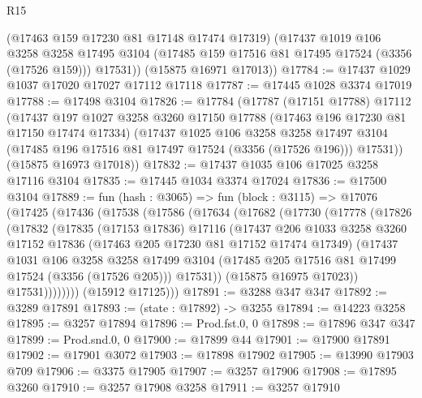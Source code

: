 \begin{lexlean}{R15}
\begin{coremodule}
        (@17463 @159 @17230 @81 @17148 @17474 @17319)
        (@17437
          @1019
          @106
          @3258
          @3258
          @17495
          @3104
          (@17485 @159 @17516 @81 @17495 @17524 (@3356 (@17526 @159)))
          @17531))
      (@15875 @16971 @17013))
@17784 := @17437 @1029 @1037 @17020 @17027 @17112 @17118
@17787 := @17445 @1028 @3374 @17019
@17788 := @17498 @3104
@17826 := @17784
    (@17787
      (@17151 @17788)
      @17112
      (@17437
        @197
        @1027
        @3258
        @3260
        @17150
        @17788
        (@17463 @196 @17230 @81 @17150 @17474 @17334)
        (@17437
          @1025
          @106
          @3258
          @3258
          @17497
          @3104
          (@17485 @196 @17516 @81 @17497 @17524 (@3356 (@17526 @196)))
          @17531))
      (@15875 @16973 @17018))
@17832 := @17437 @1035 @106 @17025 @3258 @17116 @3104
@17835 := @17445 @1034 @3374 @17024
@17836 := @17500 @3104
@17889 := fun (hash : @3065) =>
  fun (block : @3115) =>
  @17076
    (@17425
      (@17436
        (@17538
          (@17586
            (@17634
              (@17682
                (@17730
                  (@17778
                    (@17826
                      (@17832
                        (@17835
                          (@17153 @17836)
                          @17116
                          (@17437
                            @206
                            @1033
                            @3258
                            @3260
                            @17152
                            @17836
                            (@17463 @205 @17230 @81 @17152 @17474 @17349)
                            (@17437
                              @1031
                              @106
                              @3258
                              @3258
                              @17499
                              @3104
                              (@17485 @205 @17516 @81 @17499 @17524 (@3356 (@17526 @205)))
                              @17531))
                          (@15875 @16975 @17023))
                        @17531))))))))
        (@15912 @17125)))
@17891 := @3288 @347 @347
@17892 := @3289 @17891
@17893 := (state : @17892) -> @3255
@17894 := @14223 @3258
@17895 := @3257 @17894
@17896 := Prod.fst.{0, 0}
@17898 := @17896 @347 @347
@17899 := Prod.snd.{0, 0}
@17900 := @17899 @44
@17901 := @17900 @17891
@17902 := @17901 @3072
@17903 := @17898 @17902
@17905 := @13990 @17903 @709
@17906 := @3375 @17905
@17907 := @3257 @17906
@17908 := @17895 @3260
@17910 := @3257 @17908 @3258
@17911 := @3257 @17910

\end{coremodule}
\end{lexlean}
